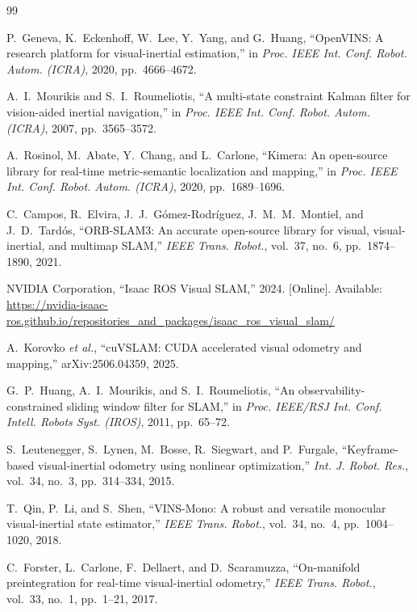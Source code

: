 \documentclass[conference,a4paper]{IEEEtran}
\begin{document}
\begin{thebibliography}{99}

P.~Geneva, K.~Eckenhoff, W.~Lee, Y.~Yang, and G.~Huang,
``OpenVINS: A research platform for visual-inertial estimation,''
in \emph{Proc. IEEE Int. Conf. Robot. Autom. (ICRA)}, 2020, pp.~4666--4672.

A.~I.~Mourikis and S.~I.~Roumeliotis,
``A multi-state constraint Kalman filter for vision-aided inertial navigation,''
in \emph{Proc. IEEE Int. Conf. Robot. Autom. (ICRA)}, 2007, pp.~3565--3572.

A.~Rosinol, M.~Abate, Y.~Chang, and L.~Carlone,
``Kimera: An open-source library for real-time metric-semantic localization and mapping,''
in \emph{Proc. IEEE Int. Conf. Robot. Autom. (ICRA)}, 2020, pp.~1689--1696.

C.~Campos, R.~Elvira, J.~J.~G\'omez-Rodr\'iguez, J.~M.~M.~Montiel, and J.~D.~Tard\'os,
``ORB-SLAM3: An accurate open-source library for visual, visual-inertial, and multimap SLAM,''
\emph{IEEE Trans. Robot.}, vol.~37, no.~6, pp.~1874--1890, 2021.

NVIDIA Corporation, ``Isaac ROS Visual SLAM,'' 2024. [Online]. Available:
\url{https://nvidia-isaac-ros.github.io/repositories_and_packages/isaac_ros_visual_slam/}

A.~Korovko \emph{et al.}, ``cuVSLAM: CUDA accelerated visual odometry and mapping,''
arXiv:2506.04359, 2025.

G.~P.~Huang, A.~I.~Mourikis, and S.~I.~Roumeliotis,
``An observability-constrained sliding window filter for SLAM,''
in \emph{Proc. IEEE/RSJ Int. Conf. Intell. Robots Syst. (IROS)}, 2011, pp.~65--72.

S.~Leutenegger, S.~Lynen, M.~Bosse, R.~Siegwart, and P.~Furgale,
``Keyframe-based visual-inertial odometry using nonlinear optimization,''
\emph{Int. J. Robot. Res.}, vol.~34, no.~3, pp.~314--334, 2015.

T.~Qin, P.~Li, and S.~Shen,
``VINS-Mono: A robust and versatile monocular visual-inertial state estimator,''
\emph{IEEE Trans. Robot.}, vol.~34, no.~4, pp.~1004--1020, 2018.

C.~Forster, L.~Carlone, F.~Dellaert, and D.~Scaramuzza,
``On-manifold preintegration for real-time visual-inertial odometry,''
\emph{IEEE Trans. Robot.}, vol.~33, no.~1, pp.~1--21, 2017.


\end{thebibliography}
\end{document}
